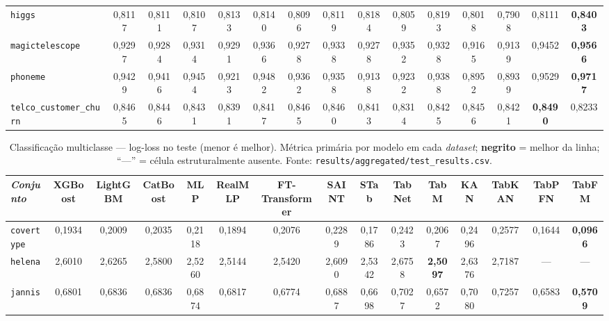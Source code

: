 \begin{landscape}
\begin{table}[htbp]
\begin{tabular}{lcccccccccccccc}
\texttt{higgs} & 0{,}8117 & 0{,}8111 & 0{,}8107 & 0{,}8133 & 0{,}8140 & 0{,}8096 & 0{,}8119 & 0{,}8184 & 0{,}8059 & 0{,}8193 & 0{,}8018 & 0{,}7908 & 0{,}8111 & \textbf{0{,}8403} \\
\texttt{magictelescope} & 0{,}9297 & 0{,}9284 & 0{,}9314 & 0{,}9291 & 0{,}9366 & 0{,}9278 & 0{,}9338 & 0{,}9278 & 0{,}9352 & 0{,}9328 & 0{,}9165 & 0{,}9139 & 0{,}9452 & \textbf{0{,}9566} \\
\texttt{phoneme} & 0{,}9429 & 0{,}9416 & 0{,}9454 & 0{,}9213 & 0{,}9482 & 0{,}9362 & 0{,}9358 & 0{,}9138 & 0{,}9232 & 0{,}9388 & 0{,}8952 & 0{,}8939 & 0{,}9529 & \textbf{0{,}9717} \\
\texttt{telco\_\allowbreak customer\_\allowbreak churn} & 0{,}8465 & 0{,}8446 & 0{,}8431 & 0{,}8391 & 0{,}8417 & 0{,}8465 & 0{,}8460 & 0{,}8413 & 0{,}8314 & 0{,}8425 & 0{,}8456 & 0{,}8421 & \textbf{0{,}8490} & 0{,}8233 \\
\bottomrule
\end{tabular}
\end{table}

\begin{table}[htbp]
\centering
\scriptsize
\setlength{\tabcolsep}{3pt}
\caption[Classificação multiclasse --- resultados completos]{Classificação multiclasse --- log-loss no teste (menor é melhor). Métrica primária por modelo em cada \emph{dataset}; \textbf{negrito} = melhor da linha; ``---'' = célula estruturalmente ausente. Fonte: \texttt{results/\allowbreak aggregated/\allowbreak test\_\allowbreak results.\allowbreak csv}.}
\label{tab:app-multiclasse}
\begin{tabular}{lcccccccccccccc}
\toprule
\emph{Conjunto} & XGBoost & LightGBM & CatBoost & MLP & RealMLP & FT-Transformer & SAINT & STab & TabNet & TabM & KAN & TabKAN & TabPFN & TabFM \\
\midrule
\texttt{covertype} & 0{,}1934 & 0{,}2009 & 0{,}2035 & 0{,}2118 & 0{,}1894 & 0{,}2076 & 0{,}2289 & 0{,}1786 & 0{,}2423 & 0{,}2067 & 0{,}2496 & 0{,}2577 & 0{,}1644 & \textbf{0{,}0966} \\
\texttt{helena} & 2{,}6010 & 2{,}6265 & 2{,}5800 & 2{,}5260 & 2{,}5144 & 2{,}5420 & 2{,}6090 & 2{,}5342 & 2{,}6758 & \textbf{2{,}5097} & 2{,}6376 & 2{,}7187 & --- & --- \\
\texttt{jannis} & 0{,}6801 & 0{,}6836 & 0{,}6836 & 0{,}6874 & 0{,}6817 & 0{,}6774 & 0{,}6887 & 0{,}6698 & 0{,}7027 & 0{,}6572 & 0{,}7080 & 0{,}7257 & 0{,}6583 & \textbf{0{,}5709} \\
\bottomrule
\end{tabular}
\end{table}


\end{landscape}
